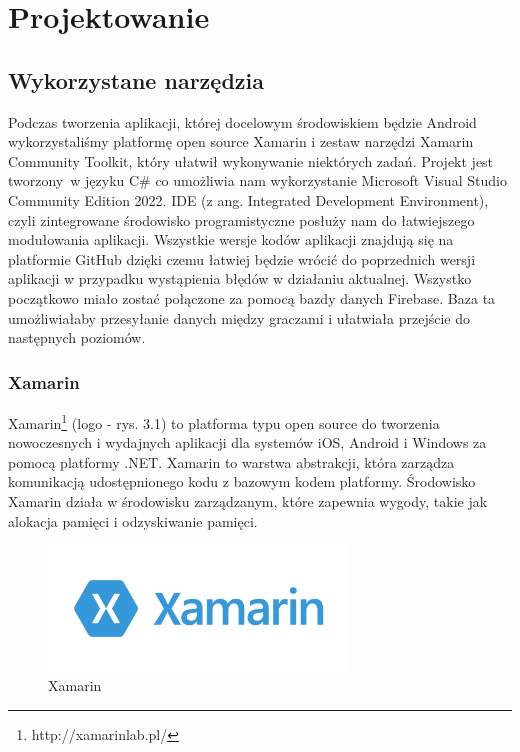 	\newpage
\section{Projektowanie}		%

\subsection{Wykorzystane narzędzia}

Podczas tworzenia aplikacji, której docelowym środowiskiem będzie Android wykorzystaliśmy platformę open source Xamarin i zestaw narzędzi Xamarin Community Toolkit, który ułatwił wykonywanie niektórych zadań. Projekt jest tworzony~w języku C\# co umożliwia nam wykorzystanie Microsoft Visual Studio Community Edition 2022. IDE (z ang. Integrated Development Environment), czyli zintegrowane środowisko programistyczne posłuży nam do łatwiejszego modułowania aplikacji. Wszystkie wersje kodów aplikacji znajdują się na platformie GitHub dzięki czemu łatwiej będzie wrócić do poprzednich wersji aplikacji w przypadku wystąpienia błędów w działaniu aktualnej. Wszystko początkowo miało zostać połączone za pomocą bazdy danych Firebase. Baza ta umożliwiałaby przesyłanie danych między graczami i ułatwiała przejście do następnych poziomów.

\subsubsection{Xamarin}

Xamarin\footnote{http://xamarinlab.pl/\cite{www1}} (logo - rys. 3.1) to platforma typu open source do tworzenia nowoczesnych i wydajnych aplikacji dla systemów iOS, Android i Windows za pomocą platformy .NET. Xamarin to warstwa abstrakcji, która zarządza komunikacją udostępnionego kodu z bazowym kodem platformy. Środowisko Xamarin działa w środowisku zarządzanym, które zapewnia wygody, takie jak alokacja pamięci i odzyskiwanie pamięci.

	\begin{figure}[!htb]
	\begin{center}
		\includegraphics[width=8cm]{rys/xamarin.png}
		\caption{Xamarin}
		\label{rys:rysunek001}
	\end{center}
\end{figure}

